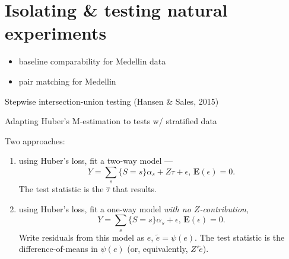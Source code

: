 \section[Isolating natural experiments]{Isolating \& testing natural experiments}


\begin{frame}

  \begin{itemize}
  \item baseline comparability for Medellin data

\item pair matching for Medellin

  \end{itemize}
  
\end{frame}

\begin{frame}{Stepwise intersection-union testing (Hansen \& Sales, 2015)}
  
\end{frame}




\begin{frame}{Adapting Huber's M-estimation to tests w/ stratified data}


      Two approaches:
      \begin{enumerate}
      \item using Huber's loss, fit a two-way model  ---
$$
Y = \sum_{s}\{S=s\}\alpha_{s} + Z\tau + \epsilon,\, \mathbf{E}(\epsilon) = 0.
$$
The test statistic is the $\hat{\tau}$ that results.
\item using Huber's loss, fit a one-way model \textit{with no $Z$-contribution},
$$
Y = \sum_{s}\{S=s\}\alpha_{s} + \epsilon,\, \mathbf{E}(\epsilon) = 0.
$$
Write residuals from this model as $e$, $\tilde{e} = \psi(e)$.  The test statistic is the difference-of-means in $\psi(e)$ (or, equivalently, $Z'\tilde{e}$).
      \end{enumerate}



  
\end{frame}

